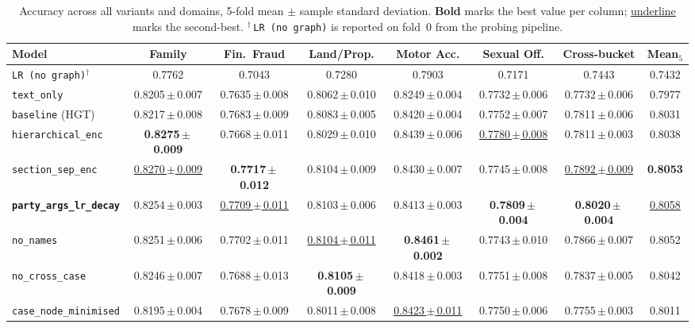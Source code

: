 \begin{table}[H]
  \centering
  \scriptsize
  \setlength{\tabcolsep}{3pt}
  \begin{adjustbox}{max width=\textwidth}
  \begin{tabular}{lccccccc}
    \toprule
    Model & Family & Fin.\ Fraud & Land/Prop. & Motor Acc. & Sexual Off. & Cross-bucket & Mean$_5$ \\
    \midrule
    \texttt{LR (no graph)}$^{\dagger}$       & 0.7762               & 0.7043               & 0.7280               & 0.7903               & 0.7171               & 0.7443               & 0.7432 \\
    \texttt{text\_only}                      & 0.8205\,$\pm$\,0.007 & 0.7635\,$\pm$\,0.008 & 0.8062\,$\pm$\,0.010 & 0.8249\,$\pm$\,0.004 & 0.7732\,$\pm$\,0.006 & 0.7732\,$\pm$\,0.006 & 0.7977 \\
    \texttt{baseline} (HGT)                  & 0.8217\,$\pm$\,0.008 & 0.7683\,$\pm$\,0.009 & 0.8083\,$\pm$\,0.005 & 0.8420\,$\pm$\,0.004 & 0.7752\,$\pm$\,0.007 & 0.7811\,$\pm$\,0.006 & 0.8031 \\
    \texttt{hierarchical\_enc}               & \textbf{0.8275\,$\pm$\,0.009} & 0.7668\,$\pm$\,0.011 & 0.8029\,$\pm$\,0.010 & 0.8439\,$\pm$\,0.006 & \underline{0.7780\,$\pm$\,0.008} & 0.7811\,$\pm$\,0.003 & 0.8038 \\
    \texttt{section\_sep\_enc}               & \underline{0.8270\,$\pm$\,0.009} & \textbf{0.7717\,$\pm$\,0.012} & 0.8104\,$\pm$\,0.009 & 0.8430\,$\pm$\,0.007 & 0.7745\,$\pm$\,0.008 & \underline{0.7892\,$\pm$\,0.009} & \textbf{0.8053} \\
    \textbf{\texttt{party\_args\_lr\_decay}} & 0.8254\,$\pm$\,0.003 & \underline{0.7709\,$\pm$\,0.011} & 0.8103\,$\pm$\,0.006 & 0.8413\,$\pm$\,0.003 & \textbf{0.7809\,$\pm$\,0.004} & \textbf{0.8020\,$\pm$\,0.004} & \underline{0.8058} \\
    \texttt{no\_names}                       & 0.8251\,$\pm$\,0.006 & 0.7702\,$\pm$\,0.011 & \underline{0.8104\,$\pm$\,0.011} & \textbf{0.8461\,$\pm$\,0.002} & 0.7743\,$\pm$\,0.010 & 0.7866\,$\pm$\,0.007 & 0.8052 \\
    \texttt{no\_cross\_case}                 & 0.8246\,$\pm$\,0.007 & 0.7688\,$\pm$\,0.013 & \textbf{0.8105\,$\pm$\,0.009} & 0.8418\,$\pm$\,0.003 & 0.7751\,$\pm$\,0.008 & 0.7837\,$\pm$\,0.005 & 0.8042 \\
    \texttt{case\_node\_minimised}           & 0.8195\,$\pm$\,0.004 & 0.7678\,$\pm$\,0.009 & 0.8011\,$\pm$\,0.008 & \underline{0.8423\,$\pm$\,0.011} & 0.7750\,$\pm$\,0.006 & 0.7755\,$\pm$\,0.003 & 0.8011 \\
    \bottomrule
  \end{tabular}
  \end{adjustbox}
  \caption{Accuracy across all variants and domains, 5-fold mean
  $\pm$ sample standard deviation. \textbf{Bold} marks the best
  value per column; \underline{underline} marks the second-best.
  $^{\dagger}$\,\texttt{LR (no graph)} is reported on fold~0 from
  the probing pipeline.}
  \label{tab:cross_bucket_accuracy}
\end{table}

